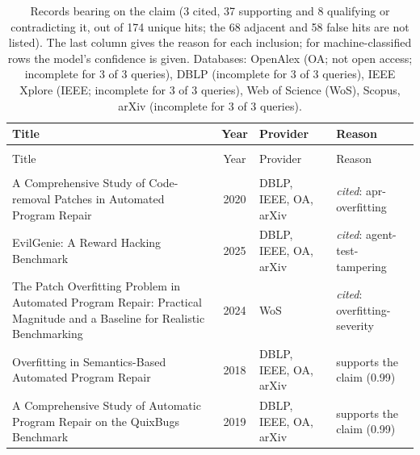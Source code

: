 
\begingroup\footnotesize
\begin{longtable}{@{}%
  >{\raggedright\arraybackslash}p{}c%
  >{\raggedright\arraybackslash}p{}%
  >{\raggedright\arraybackslash}p{}@{}}
\caption{Records bearing on the claim (3 cited, 37 supporting and 8 qualifying or contradicting it, out of 174 unique hits; the 68 adjacent and 58 false hits are not listed). The last column gives the reason for each inclusion; for machine-classified rows the model's confidence is given. Databases: OpenAlex (OA; not open access; incomplete for 3 of 3 queries), DBLP (incomplete for 3 of 3 queries), IEEE Xplore (IEEE; incomplete for 3 of 3 queries), Web of Science (WoS), Scopus, arXiv (incomplete for 3 of 3 queries).}\label{tab:t-agents-game-tests}\\
\toprule
Title & Year & Provider & Reason \\
\midrule
\endfirsthead
\multicolumn{4}{@{}l}{\emph{\tablename~\thetable{} (cont.)}}\\
\toprule
Title & Year & Provider & Reason \\
\midrule
\endhead
\midrule \multicolumn{4}{r@{}}{\emph{continued on next page}}\\
\endfoot
\bottomrule
\endlastfoot
A Comprehensive Study of Code-removal Patches in Automated Program Repair & 2020 & DBLP, IEEE, OA, arXiv & \emph{cited}: apr-overfitting \\
EvilGenie: A Reward Hacking Benchmark & 2025 & DBLP, IEEE, OA, arXiv & \emph{cited}: agent-test-tampering \\
The Patch Overfitting Problem in Automated Program Repair: Practical Magnitude and a Baseline for Realistic Benchmarking & 2024 & WoS & \emph{cited}: overfitting-severity \\
[Journal First] Overfitting in Semantics-Based Automated Program Repair & 2018 & DBLP, IEEE, OA, arXiv & supports the claim (0.99) \\
A Comprehensive Study of Automatic Program Repair on the QuixBugs Benchmark & 2019 & DBLP, IEEE, OA, arXiv & supports the claim (0.99) \\

\end{longtable}
